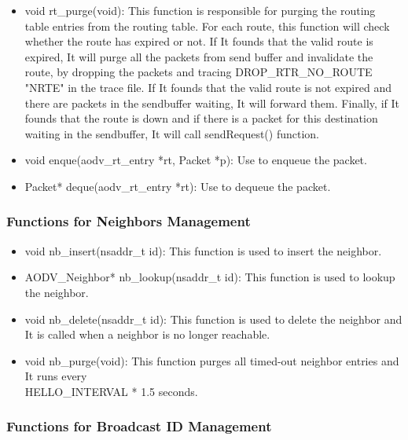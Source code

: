 \documentclass[times,10pt,onecolumn]{article}
\begin{document}
\begin{itemize}
\item void rt\_purge(void): This function is responsible for purging the routing table entries from the routing table. For each route, this function will check whether the route has expired or not. If It founds that the valid route is expired, It will purge all the packets from send buffer and invalidate the route, by dropping the packets and tracing DROP\_RTR\_NO\_ROUTE "NRTE" in the trace file. If It founds that the valid route is not expired and there are packets in the sendbuffer waiting, It will forward them. Finally, if It founds that the route is down and if there is a packet for this destination waiting in the sendbuffer, It will call sendRequest() function.
\vspace{05pt}

\item void enque(aodv\_rt\_entry *rt, Packet *p): Use to enqueue the packet.
\vspace{05pt}
\item Packet* deque(aodv\_rt\_entry *rt): Use to dequeue the packet.

\end{itemize}

\vspace{20pt}

\subsubsection{Functions for Neighbors Management}
\label{sec:funneighbors}

\begin{itemize}
\item void nb\_insert(nsaddr\_t id): This function is used to insert the neighbor.
\item AODV\_Neighbor* nb\_lookup(nsaddr\_t id): This function is used to lookup the neighbor.
\item void nb\_delete(nsaddr\_t id): This function is used to delete the neighbor and It is called when a neighbor is no longer reachable.
\item void nb\_purge(void): This function purges all timed-out neighbor entries and It runs every \\
HELLO\_INTERVAL * 1.5 seconds.

\end{itemize}

\vspace{20pt}

\subsubsection{Functions for Broadcast ID Management}
\label{sec:funbroadcastid}
\end{document}
